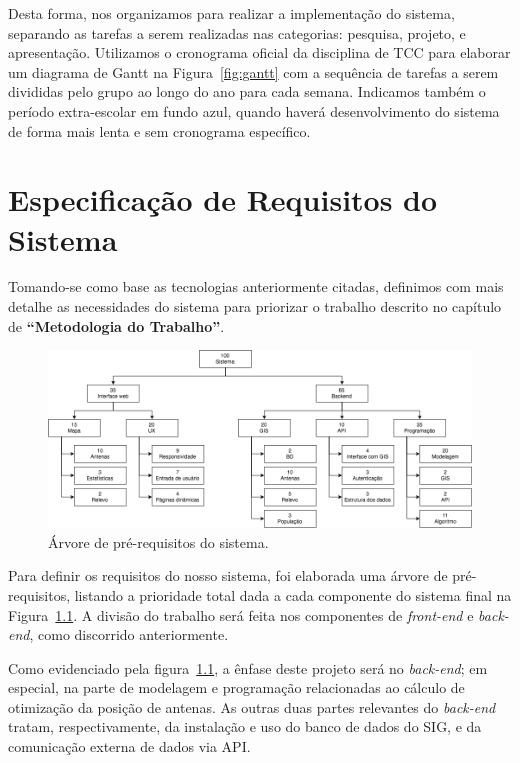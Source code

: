 \documentclass[]{politex}
\begin{document}
Desta forma, nos organizamos para realizar a implementação do sistema, separando
as tarefas a serem realizadas nas categorias: pesquisa, projeto, e apresentação.
Utilizamos o cronograma oficial da disciplina de TCC para elaborar um diagrama de Gantt na
Figura~\ref{fig:gantt} com a sequência de tarefas a serem divididas pelo grupo
ao longo do ano para cada semana. Indicamos também o período extra-escolar em
fundo azul, quando haverá desenvolvimento do sistema de forma mais lenta e
sem cronograma específico.

\chapter{Especificação de Requisitos do Sistema}

Tomando-se como base as tecnologias anteriormente citadas, definimos com mais
detalhe as necessidades do sistema para priorizar o trabalho descrito no
capítulo de \textbf{``Metodologia do Trabalho''}.

\begin{figure}[H]
    \centering
    \includegraphics[width=6in]{imagens/arvore_prerequisitos}
    \caption{Árvore de pré-requisitos do sistema.}
    \label{fig:arvore_prerequisitos}
\end{figure}

Para definir os requisitos do nosso sistema, foi elaborada uma árvore de
pré-requisitos, listando a prioridade total dada a cada componente do sistema
final na Figura~\ref{fig:arvore_prerequisitos}. A divisão do trabalho será
feita nos componentes de \textit{front-end} e \textit{back-end}, como discorrido
anteriormente.

Como evidenciado pela figura~\ref{fig:arvore_prerequisitos}, a ênfase deste projeto será no \textit{back-end};
em especial, na parte de modelagem e programação relacionadas ao cálculo de
otimização da posição de antenas. As outras duas partes relevantes do
\textit{back-end} tratam, respectivamente, da instalação e uso do banco de dados do SIG, e
da comunicação externa de dados via API.
\end{document}
